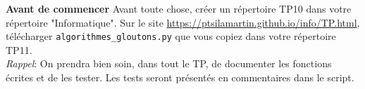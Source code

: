 \documentclass[
	fontsize=10pt, %
	twoside=true, %
]{kaobook}
\newcommand{\repRel}{../../../..}
\begin{document}
\iflivret {} \else
\ifprof  {} \else \fi
\fi
\proftrue



\textbf{Avant de commencer}
Avant toute chose, créer un répertoire TP10 dans votre répertoire "Informatique". Sur le site \url{https://ptsilamartin.github.io/info/TP.html}, télécharger \lstinline{algorithmes_gloutons.py} que vous copiez dans votre répertoire TP11.\\

\emph{Rappel}: On prendra bien soin, dans tout le TP, de documenter les fonctions écrites et de les tester. Les tests seront présentés en commentaires dans le script.


\renewcommand{\repExo}{\repRel/Informatique/Exercices/S1_06_Gloutons/}
\renewcommand{\nomExo}{08_VoyageurCommerce}


\renewcommand{\repExo}{\repRel/Informatique/Exercices/S1_06_Gloutons/}
\renewcommand{\nomExo}{05_SacADos}




%
% 
%
\end{document}
